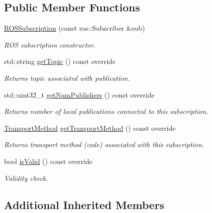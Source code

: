 \subsection*{Public Member Functions}
\begin{DoxyCompactItemize}
\item 
\hyperlink{classflow__ros_1_1routing_1_1_r_o_s_subscription_a8223b1ebd0550e650a53c8593a524253}{R\+O\+S\+Subscription} (const ros\+::\+Subscriber \&sub)
\begin{DoxyCompactList}\small\item\em R\+OS subscription constructor. \end{DoxyCompactList}\item 
std\+::string \hyperlink{classflow__ros_1_1routing_1_1_r_o_s_subscription_a3bdbb4897a1a8bdb67af2f72fb7645a7}{get\+Topic} () const override
\begin{DoxyCompactList}\small\item\em Returns topic associated with publication. \end{DoxyCompactList}\item 
std\+::uint32\+\_\+t \hyperlink{classflow__ros_1_1routing_1_1_r_o_s_subscription_a90b710d0cd089f60a3a2549acae6e8cb}{get\+Num\+Publishers} () const override
\begin{DoxyCompactList}\small\item\em Returns number of local publications connected to this subscription. \end{DoxyCompactList}\item 
\hyperlink{transport__info_8h_ae57afcf849a5bdb82b958347c6ccc57b}{Transport\+Method} \hyperlink{classflow__ros_1_1routing_1_1_r_o_s_subscription_a3dc2cff4348f072352a307c6902d1a18}{get\+Transport\+Method} () const override
\begin{DoxyCompactList}\small\item\em Returns transport method (code) associated with this subscription. \end{DoxyCompactList}\item 
bool \hyperlink{classflow__ros_1_1routing_1_1_r_o_s_subscription_a5f845fe965a9b166b02a87ffbb00e6ac}{is\+Valid} () const override
\begin{DoxyCompactList}\small\item\em Validity check. \end{DoxyCompactList}\end{DoxyCompactItemize}
\subsection*{Additional Inherited Members}


